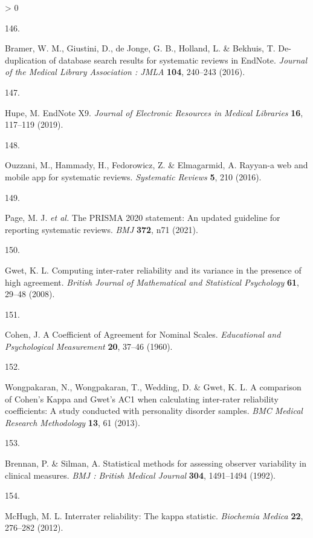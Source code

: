 \documentclass[a4paper, twoside]{templates/ociamthesis}
\newlength{\cslhangindent}
\newlength{\csllabelwidth}
\newenvironment{CSLReferences}[3] %
 {%
  \setlength{\parindent}{0pt}
  \ifodd #1 \everypar{\setlength{\hangindent}{\cslhangindent}}\ignorespaces\fi
  \ifnum #2 > 0
  \setlength{\parskip}{#2\baselineskip}
  \fi
 }%
 {}
\newcommand{\CSLLeftMargin}[1]{\parbox[t]{\maxof{\widthof{#1}}{\csllabelwidth}}{#1}}
\newcommand{\CSLRightInline}[1]{\parbox[t]{\linewidth - \csllabelwidth}{#1}}
\begin{document}
\begin{CSLReferences}{0}{0}
\leavevmode\hypertarget{ref-bramer2016}{}%
\CSLLeftMargin{146. }
\CSLRightInline{Bramer, W. M., Giustini, D., de Jonge, G. B., Holland, L. \& Bekhuis, T. De-duplication of database search results for systematic reviews in {EndNote}. \emph{Journal of the Medical Library Association : JMLA} \textbf{104}, 240--243 (2016).}

\leavevmode\hypertarget{ref-hupe2019}{}%
\CSLLeftMargin{147. }
\CSLRightInline{Hupe, M. {EndNote X9}. \emph{Journal of Electronic Resources in Medical Libraries} \textbf{16}, 117--119 (2019).}

\leavevmode\hypertarget{ref-ouzzani2016}{}%
\CSLLeftMargin{148. }
\CSLRightInline{Ouzzani, M., Hammady, H., Fedorowicz, Z. \& Elmagarmid, A. Rayyan-a web and mobile app for systematic reviews. \emph{Systematic Reviews} \textbf{5}, 210 (2016).}

\leavevmode\hypertarget{ref-page2021}{}%
\CSLLeftMargin{149. }
\CSLRightInline{Page, M. J. \emph{et al.} The {PRISMA} 2020 statement: An updated guideline for reporting systematic reviews. \emph{BMJ} \textbf{372}, n71 (2021).}

\leavevmode\hypertarget{ref-gwet2008}{}%
\CSLLeftMargin{150. }
\CSLRightInline{Gwet, K. L. Computing inter-rater reliability and its variance in the presence of high agreement. \emph{British Journal of Mathematical and Statistical Psychology} \textbf{61}, 29--48 (2008).}

\leavevmode\hypertarget{ref-cohen1960}{}%
\CSLLeftMargin{151. }
\CSLRightInline{Cohen, J. A {Coefficient} of {Agreement} for {Nominal Scales}. \emph{Educational and Psychological Measurement} \textbf{20}, 37--46 (1960).}

\leavevmode\hypertarget{ref-wongpakaran2013}{}%
\CSLLeftMargin{152. }
\CSLRightInline{Wongpakaran, N., Wongpakaran, T., Wedding, D. \& Gwet, K. L. A comparison of {Cohen}'s {Kappa} and {Gwet}'s {AC1} when calculating inter-rater reliability coefficients: A study conducted with personality disorder samples. \emph{BMC Medical Research Methodology} \textbf{13}, 61 (2013).}

\leavevmode\hypertarget{ref-brennan1992}{}%
\CSLLeftMargin{153. }
\CSLRightInline{Brennan, P. \& Silman, A. Statistical methods for assessing observer variability in clinical measures. \emph{BMJ : British Medical Journal} \textbf{304}, 1491--1494 (1992).}

\leavevmode\hypertarget{ref-mchugh2012}{}%
\CSLLeftMargin{154. }
\CSLRightInline{McHugh, M. L. Interrater reliability: The kappa statistic. \emph{Biochemia Medica} \textbf{22}, 276--282 (2012).}


\end{CSLReferences}
\end{document}
